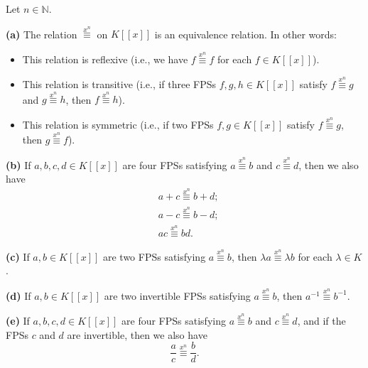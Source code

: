 \begin{theorem}
\label{thm.fps.xneq.props}
\leantarget
\leanok
Let $n\in\mathbb{N}$. \medskip

\textbf{(a)} The relation $\overset{x^{n}}{\equiv}$ on $K\left[\left[
x\right]\right]$ is an equivalence relation. In other words:

\begin{itemize}
\item This relation is reflexive (i.e., we have $f\overset{x^{n}}{\equiv}f$
for each $f\in K\left[\left[x\right]\right]$).

\item This relation is transitive (i.e., if three FPSs $f,g,h\in K\left[
\left[x\right]\right]$ satisfy $f\overset{x^{n}}{\equiv}g$ and
$g\overset{x^{n}}{\equiv}h$, then $f\overset{x^{n}}{\equiv}h$).

\item This relation is symmetric (i.e., if two FPSs $f,g\in K\left[\left[
x\right]\right]$ satisfy $f\overset{x^{n}}{\equiv}g$, then
$g\overset{x^{n}}{\equiv}f$).
\end{itemize}

\textbf{(b)} If $a,b,c,d\in K\left[\left[x\right]\right]$ are four
FPSs satisfying $a\overset{x^{n}}{\equiv}b$ and $c\overset{x^{n}}{\equiv}d$,
then we also have
\begin{align}
&  a+c\overset{x^{n}}{\equiv}b+d;\label{eq.thm.fps.xneq.props.b.+}\\
&  a-c\overset{x^{n}}{\equiv}b-d;\label{eq.thm.fps.xneq.props.b.-}\\
&  ac\overset{x^{n}}{\equiv}bd. \label{eq.thm.fps.xneq.props.b.*}
\end{align}

\textbf{(c)} If $a,b\in K\left[\left[x\right]\right]$ are two FPSs
satisfying $a\overset{x^{n}}{\equiv}b$, then $\lambda a\overset{x^{n}}{\equiv
}\lambda b$ for each $\lambda\in K$. \medskip

\textbf{(d)} If $a,b\in K\left[\left[x\right]\right]$ are two
invertible FPSs satisfying $a\overset{x^{n}}{\equiv}b$, then $a^{-1}
\overset{x^{n}}{\equiv}b^{-1}$. \medskip

\textbf{(e)} If $a,b,c,d\in K\left[\left[x\right]\right]$ are four
FPSs satisfying $a\overset{x^{n}}{\equiv}b$ and $c\overset{x^{n}}{\equiv}d$,
and if the FPSs $c$ and $d$ are invertible, then we also have
\begin{equation}
\dfrac{a}{c}\overset{x^{n}}{\equiv}\dfrac{b}{d}.
\label{eq.thm.fps.xneq.props.e./}
\end{equation}


\end{theorem}
